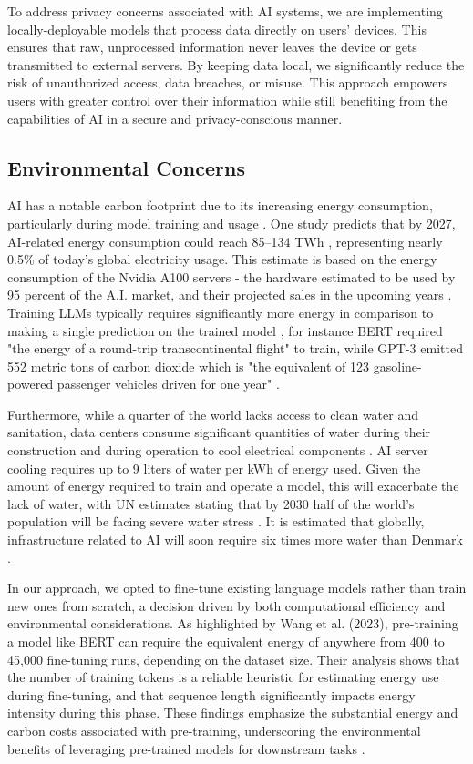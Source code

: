 \documentclass[licencjacka,en]{pracamgr}
\begin{document}
To address privacy concerns associated with AI systems, we are implementing locally-deployable models that process data directly on users' devices. This ensures that raw, unprocessed information never leaves the device or gets transmitted to external servers. By keeping data local, we significantly reduce the risk of unauthorized access, data breaches, or misuse. This approach empowers users with greater control over their information while still benefiting from the capabilities of AI in a secure and privacy-conscious manner. 

\subsection{Environmental Concerns}
AI has a notable carbon footprint due to its increasing energy consumption, particularly during model training and usage \cite{forbes_dl_env}. One study predicts that by 2027, AI-related energy consumption could reach 85–134 TWh \cite{this_study}, representing nearly 0.5\% of today's global electricity usage. This estimate is based on the energy consumption of the Nvidia A100 servers - the hardware estimated to be used by 95 percent of the A.I. market, and their projected sales in the upcoming years \cite{nyt_el}. Training LLMs typically requires significantly more energy in comparison to making a single prediction on the trained model \cite{sci_dir_comp}, for instance BERT required "the energy of a round-trip transcontinental flight" to train, while GPT-3 emitted 552 metric tons of carbon dioxide which is "the equivalent of 123 gasoline-powered passenger vehicles driven for one year" \cite{sci_am_co2}. 

Furthermore, while a quarter of the world lacks access to clean water and sanitation, data centers consume significant quantities of water during their construction and during operation to cool electrical components \cite{first}. AI server cooling requires up to 9 liters of water per kWh of energy used. Given the amount of energy required to train and operate a model, this will exacerbate the lack of water, with UN estimates stating that by 2030 half of the world’s population will be facing severe water stress \cite{water_scarcity}. It is estimated that globally, infrastructure related to AI will soon require six times more water than Denmark \cite{first}. 

In our approach, we opted to fine-tune existing language models rather than train new ones from scratch, a decision driven by both computational efficiency and environmental considerations. As highlighted by Wang et al. (2023), pre-training a model like BERT can require the equivalent energy of anywhere from 400 to 45,000 fine-tuning runs, depending on the dataset size. Their analysis shows that the number of training tokens is a reliable heuristic for estimating energy use during fine-tuning, and that sequence length significantly impacts energy intensity during this phase. These findings emphasize the substantial energy and carbon costs associated with pre-training, underscoring the environmental benefits of leveraging pre-trained models for downstream tasks \cite{finetuning_env_good}.
\end{document}
